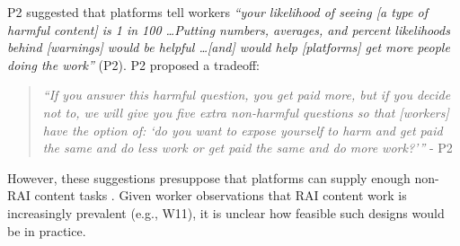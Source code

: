 P2 suggested that platforms tell workers \textit{``your likelihood of seeing [a type of harmful content] is 1 in 100 \dots Putting numbers, averages, and percent likelihoods behind [warnings] would be helpful \dots [and] would help [platforms] get more people doing the work''} (P2). P2 proposed a tradeoff: 
\begin{quote}
    \textit{``If you answer this harmful question, you get paid more, but if you decide not to, we will give you five extra non-harmful questions so that [workers] have the option of: `do you want to expose yourself to harm and get paid the same and do less work or get paid the same and do more work?'''} - P2
\end{quote}
However, these suggestions presuppose that platforms can supply enough non-RAI content tasks . Given worker observations that RAI content work is increasingly prevalent (e.g., W11), it is unclear how feasible such designs would be in practice. 

